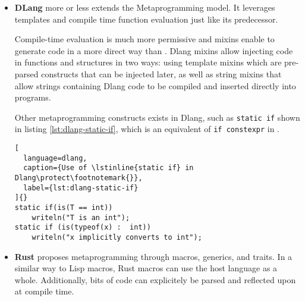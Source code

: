 \documentclass[../main]{subfiles}
\begin{document}
\begin{itemize}
Listing \ref{lst:metaocaml-spower} shows an example of runtime specialization
of a power function called \lstinline{spowern}. It takes an integer $N$
as an input, and returns a function that calculates the $N^{th}$ power
of its single input parameter.

\begin{lstlisting}[
  language=caml,
  caption={Definition of the power function in MetaOCaml\protect\footnotemark{}},
  label={lst:metaocaml-spower}
]{}
let rec spower : int -> int code -> int code =
  fun n x ->
    if n = 0 then .<1>.
    else if n mod 2 = 0
      then .< square .~(spower (n/2) x) >.
      else .<.~x * .~(spower (n-1) x)>.

let spowern : int -> (int -> int) code =
   fun n -> .<fun x -> .~(spower n .<x>.)>.;;
\end{lstlisting}

\item
\textbf{DLang} more or less extends the \cpp Metaprogramming model.
It leverages templates and compile time function evaluation just like
its predecessor.

Compile-time evaluation is much more permissive and mixins enable to generate
code in a more direct way than \cpp. Dlang mixins allow injecting code in
functions and structures in two ways: using template mixins
which are pre-parsed constructs that can be injected later,
as well as string mixins that allow strings containing Dlang code
to be compiled and inserted directly into programs.

Other metaprogramming constructs exists in Dlang, such as \lstinline{static if}
shown in listing \ref{lst:dlang-static-if}, which is an equivalent of
\lstinline{if constexpr} in \cpp.

\begin{lstlisting}[
  language=dlang,
  caption={Use of \lstinline{static if} in Dlang\protect\footnotemark{}},
  label={lst:dlang-static-if}
]{}
static if(is(T == int))
    writeln("T is an int");
static if (is(typeof(x) :  int))
    writeln("x implicitly converts to int");
\end{lstlisting}

\item
\textbf{Rust} proposes metaprogramming through macros, generics, and traits.
In a similar way to Lisp macros, Rust macros can use the host language
as a whole. Additionally, bits of code can explicitely be parsed and reflected
upon at compile time.


\end{itemize}
\end{document}
